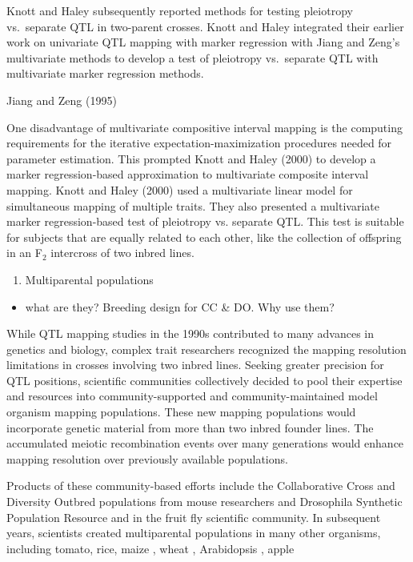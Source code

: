 \documentclass[]{article}
\providecommand{\tightlist}{%
  \setlength{\itemsep}{0pt}\setlength{\parskip}{0pt}}
\begin{document}
Knott and Haley subsequently reported methods for testing pleiotropy
vs.~separate QTL in two-parent crosses. Knott and Haley integrated their
earlier work on univariate QTL mapping with marker regression with Jiang
and Zeng's multivariate methods to develop a test of pleiotropy
vs.~separate QTL with multivariate marker regression methods.

Jiang and Zeng (1995)

One disadvantage of multivariate compositive interval mapping is the
computing requirements for the iterative expectation-maximization
procedures needed for parameter estimation. This prompted Knott and
Haley (2000) to develop a marker regression-based approximation to
multivariate composite interval mapping. Knott and Haley (2000) used a
multivariate linear model for simultaneous mapping of multiple traits.
They also presented a multivariate marker regression-based test of
pleiotropy vs. separate QTL. This test is suitable for subjects that are
equally related to each other, like the collection of offspring in an
F\(_2\) intercross of two inbred lines.

\begin{enumerate}
\def\labelenumi{\arabic{enumi}.}
\setcounter{enumi}{3}
\tightlist
\item
  Multiparental populations
\end{enumerate}

\begin{itemize}
\tightlist
\item
  what are they? Breeding design for CC \& DO. Why use them?
\end{itemize}

While QTL mapping studies in the 1990s contributed to many advances in
genetics and biology, complex trait researchers recognized the mapping
resolution limitations in crosses involving two inbred lines. Seeking
greater precision for QTL positions, scientific communities collectively
decided to pool their expertise and resources into community-supported
and community-maintained model organism mapping populations. These new
mapping populations would incorporate genetic material from more than
two inbred founder lines. The accumulated meiotic recombination events
over many generations would enhance mapping resolution over previously
available populations.

Products of these community-based efforts include the Collaborative
Cross and Diversity Outbred populations from mouse researchers and
Drosophila Synthetic Population Resource \citep{king2012genetic} and  in the fruit fly
scientific community. In subsequent years, scientists created
multiparental populations in many other organisms, including tomato, rice, maize \citep{lehermeier2014usefulness}, wheat \citep{mackay2014eight, huang2012multiparent, milner2016multiparental}, Arabidopsis \citep{}, apple \citep{allard2016detecting}
\end{document}
